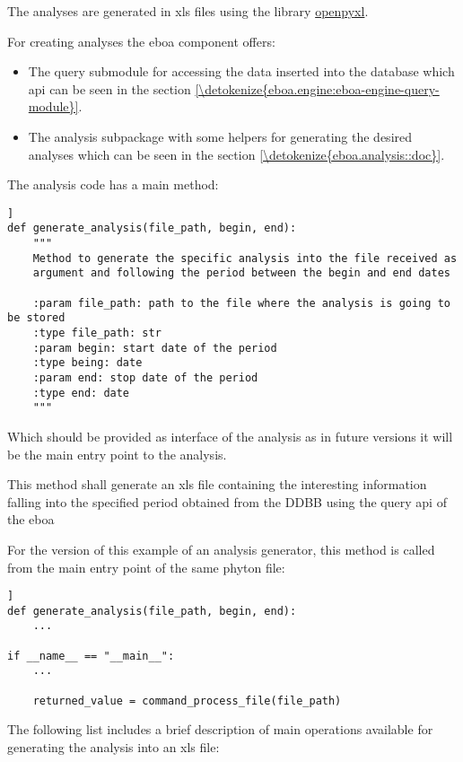 The analyses are generated in xls files using the library \href{https://openpyxl.readthedocs.io/en/stable/}{openpyxl}.

For creating analyses the \acrshort{eboa} component offers:

\begin{itemize}
\item The query submodule for accessing the data inserted into the database which \acrshort{api} can be seen in the section \ref{\detokenize{eboa.engine:eboa-engine-query-module}}.
\item The analysis subpackage with some helpers for generating the desired analyses which can be seen in the section \ref{\detokenize{eboa.analysis::doc}}.
\end{itemize}

The analysis code has a main method:

\begin{lstlisting}[breaklines=true, style=python]]
def generate_analysis(file_path, begin, end):
    """
    Method to generate the specific analysis into the file received as
    argument and following the period between the begin and end dates
    
    :param file_path: path to the file where the analysis is going to be stored
    :type file_path: str
    :param begin: start date of the period
    :type being: date
    :param end: stop date of the period
    :type end: date
    """
\end{lstlisting}

Which should be provided as interface of the analysis as in future versions it will be the main entry point to the analysis.

This method shall generate an xls file containing the interesting information falling into the specified period obtained from the DDBB using the query \acrshort{api} of the \acrshort{eboa}

For the version of this example of an analysis generator, this method is called from the main entry point of the same phyton file:

\begin{lstlisting}[breaklines=true, style=python]]
def generate_analysis(file_path, begin, end):
    ...

if __name__ == "__main__":
    ...

    returned_value = command_process_file(file_path)
\end{lstlisting}

The following list includes a brief description of main operations available for generating the analysis into an xls file:

